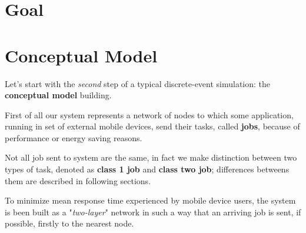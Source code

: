 \documentclass[10pt,a4paper]{article}
\begin{document}
\section{Goal}




\section{Conceptual Model}

Let's start with the \textit{second} step of a typical discrete-event simulation: the \textbf{conceptual model} building. 

First of all our system represents a network of nodes to which some application, running in set of external mobile devices, send their tasks, called \textbf{jobs}, because of performance or energy saving reasons. 

Not all job sent to system are the same, in fact we make distinction between two types of task, denoted as \textbf{class 1 job} and \textbf{class two job}; differences betweens them are described in following sections. 

To minimize mean response time experienced by mobile device users, the system is been built as a "\textit{two-layer}" network in such a way that an arriving job is sent, if possible, firstly to the nearest node.
\end{document}
